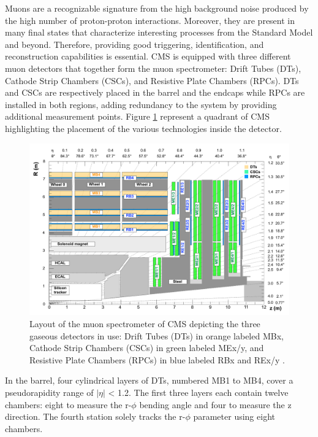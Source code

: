     Muons are a recognizable signature from the high background noise produced by the high number of proton-proton interactions. Moreover, they are present in many final states that characterize interesting processes from the Standard Model and beyond. Therefore, providing good triggering, identification, and reconstruction capabilities is essential. CMS is equipped with three different muon detectors that together form the muon spectrometer: Drift Tubes (DTs), Cathode Strip Chambers (CSCs), and Resistive Plate Chambers (RPCs). DTs and CSCs are respectively placed in the barrel and the endcaps while RPCs are installed in both regions, adding redundancy to the system by providing additional measurement points. Figure \ref{fig:I-3-muons} represent a quadrant of CMS highlighting the placement of the various technologies inside the detector. \\

    \begin{figure}[h!]
      \centering
      \includegraphics[width=\textwidth]{img/I-3-cms/muons.pdf}
      \caption{Layout of the muon spectrometer of CMS depicting the three gaseous detectors in use: Drift Tubes (DTs) in orange labeled MBx, Cathode Strip Chambers (CSCs) in green labeled MEx/y, and Resistive Plate Chambers (RPCs) in blue labeled RBx and REx/y \cite{1748-0221-3-08-S08004}.}
      \label{fig:I-3-muons}
    \end{figure}

    In the barrel, four cylindrical layers of DTs, numbered MB1 to MB4, cover a pseudorapidity range of $ | \eta | $ < 1.2. The first three layers each contain twelve chambers: eight to measure the r-$\phi$ bending angle and four to measure the z direction. The fourth station solely tracks the r-$\phi$ parameter using eight chambers. \\

